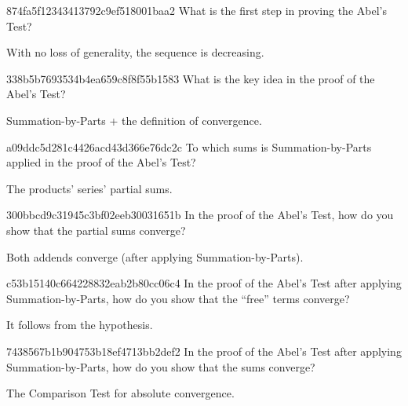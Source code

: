 \begin{note}{874fa5f12343413792c9ef518001baa2}
    What is the first step in proving the Abel's Test?

    \begin{cloze}{1}
        With no loss of generality, the sequence is decreasing.
    \end{cloze}
\end{note}

\begin{note}{338b5b7693534b4ea659c8f8f55b1583}
    What is the key idea in the proof of the Abel's Test?

    \begin{cloze}{1}
        Summation-by-Parts + the definition of convergence.
    \end{cloze}
\end{note}

\begin{note}{a09ddc5d281c4426acd43d366e76dc2c}
    To which sums is Summation-by-Parts applied in the proof of the Abel's Test?

    \begin{cloze}{1}
        The products' series' partial sums.
    \end{cloze}
\end{note}

\begin{note}{300bbcd9c31945c3bf02eeb30031651b}
    In the proof of the Abel's Test, how do you show that the partial sums converge?

    \begin{cloze}{1}
        Both addends converge (after applying Summation-by-Parts).
    \end{cloze}
\end{note}

\begin{note}{c53b15140c664228832eab2b80cc06c4}
    In the proof of the Abel's Test after applying Summation-by-Parts, how do you show that the ``free'' terms converge?

    \begin{cloze}{1}
        It follows from the hypothesis.
    \end{cloze}
\end{note}

\begin{note}{7438567b1b904753b18ef4713bb2def2}
    In the proof of the Abel's Test after applying Summation-by-Parts, how do you show that the sums converge?

    \begin{cloze}{1}
        The Comparison Test for absolute convergence.
    \end{cloze}
\end{note}

